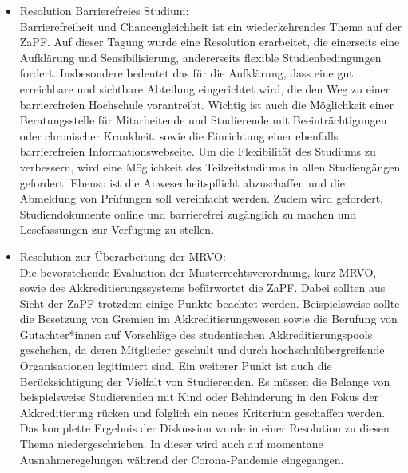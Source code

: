 \documentclass[a4paper, 11pt]{scrartcl}
\begin{document}
	\begin{itemize}
		\item Resolution Barrierefreies Studium:\\
Barrierefreiheit und Chancengleichheit ist ein wiederkehrendes Thema auf der ZaPF. Auf dieser Tagung wurde eine Resolution erarbeitet, die einerseits eine Aufklärung und Sensibilisierung, andererseits flexible Studienbedingungen fordert. Insbesondere bedeutet das für die Aufklärung, dass eine gut erreichbare und sichtbare Abteilung eingerichtet wird, die den Weg zu einer barrierefreien Hochschule vorantreibt. Wichtig ist auch die Möglichkeit einer Beratungsstelle für Mitarbeitende und Studierende mit
Beeinträchtigungen oder chronischer Krankheit. sowie die Einrichtung einer ebenfalls barrierefreien Informationswebseite. Um die Flexibilität des Studiums zu verbessern, wird eine Möglichkeit des Teilzeitstudiums in allen Studiengängen gefordert. Ebenso ist die Anwesenheitspflicht abzuschaffen und die Abmeldung von Prüfungen soll vereinfacht werden. Zudem wird gefordert, Studiendokumente online und barrierefrei zugänglich zu machen und Lesefassungen zur Verfügung zu stellen.

		\item Resolution zur Überarbeitung der MRVO:\\
Die bevorstehende Evaluation der Musterrechtsverordnung, kurz MRVO, sowie des Akkreditierungssystems befürwortet die ZaPF. Dabei sollten aus Sicht der ZaPF trotzdem einige Punkte beachtet werden. Beispielsweise sollte die Besetzung von Gremien im Akkreditierungswesen sowie die Berufung von Gutachter*innen auf Vorschläge des studentischen Akkreditierungspools geschehen, da deren Mitglieder geschult und durch hochschulübergreifende Organisationen legitimiert sind. Ein weiterer Punkt ist auch die Berücksichtigung der Vielfalt von Studierenden. Es müssen die Belange von beispielsweise Studierenden mit Kind oder Behinderung in den Fokus der Akkreditierung rücken und folglich ein neues Kriterium geschaffen werden. Das komplette Ergebnis der Diskussion wurde in einer Resolution zu diesen Thema niedergeschrieben. In dieser wird auch auf momentane Ausnahmeregelungen während der Corona-Pandemie eingegangen.


\end{itemize}
\end{document}
